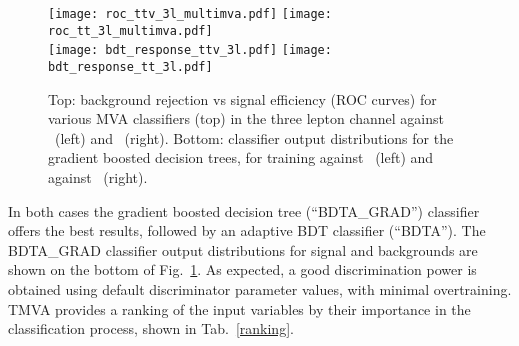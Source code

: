 \begin{figure} [!h]
  \centering
   \texttt{[image: roc\_ttv\_3l\_multimva.pdf]}
   \texttt{[image: roc\_tt\_3l\_multimva.pdf]} \\
   \texttt{[image: bdt\_response\_ttv\_3l.pdf]}
   \texttt{[image: bdt\_response\_tt\_3l.pdf]}
\caption[MVA classifiers performance.]{Top: background rejection vs signal efficiency (ROC curves) for various MVA classifiers (top) in the three lepton channel against \ttV\ (left) and \ttbar\ (right). Bottom: classifier output distributions for the gradient boosted decision trees, for training against \ttV\ (left) and against \ttbar\ (right).}
\label{roc}
\end{figure} 


In both cases the gradient boosted decision tree (``BDTA\_GRAD'') classifier offers the best results, followed by an adaptive BDT classifier (``BDTA''). The BDTA\_GRAD classifier output distributions for signal and backgrounds are shown on the bottom of Fig.~\ref{roc}. As expected, a good discrimination power is obtained using default discriminator parameter values, with minimal overtraining. TMVA provides a ranking of the input variables by their importance in the classification process, shown in Tab.~\ref{ranking}.

